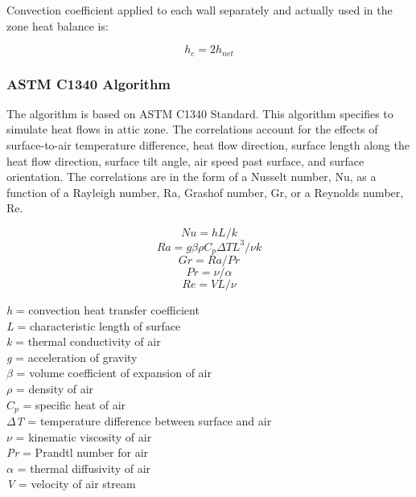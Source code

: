 Convection coefficient applied to each wall separately and actually used in the zone heat balance is:

\begin{equation}
{h_c} = 2{h_{net}}
\end{equation}

\subsubsection{ASTM C1340 Algorithm}\label{ASTM-C1340-algorithm}

The algorithm is based on ASTM C1340 Standard. This algorithm specifies to simulate heat flows in attic zone. The correlations account for the effects of surface-to-air temperature difference, heat flow direction, surface length along the heat flow direction, surface tilt angle, air speed past surface, and surface orientation. The correlations are in the form of a Nusselt number, Nu, as a function of a Rayleigh number, Ra, Grashof number, Gr, or a Reynolds number, Re.

\begin{equation}
Nu = hL/k
\end{equation}
\begin{equation}
Ra = g \beta \rho C_p \Delta TL^3 / \nu k
\end{equation}
\begin{equation}
Gr = Ra / Pr
\end{equation}
\begin{equation}
Pr = \nu / \alpha
\end{equation}
\begin{equation}
Re = VL/ \nu
\end{equation}

\noindent
\emph{h} = convection heat transfer coefficient \\
\emph{L} = characteristic length of surface \\
\emph{k} = thermal conductivity of air \\
\emph{g} = acceleration of gravity \\
$\beta$ = volume coefficient of expansion of air\\
$\rho$ = density of air\\
$C_p$ = specific heat of air\\
\emph{$\Delta$T} = temperature difference between surface and air\\
$\nu$ = kinematic viscosity of air\\
\emph{Pr} = Prandtl number for air\\
$\alpha$ = thermal diffusivity of air\\
\emph{V} = velocity of air stream\\

